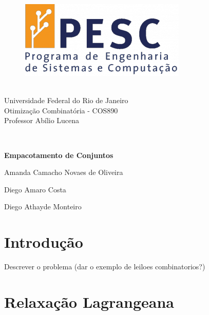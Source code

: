 \documentclass{article}
\begin{document}
	\begin{figure}
		\begin{flushleft}	
			\includegraphics[height=.065\textheight]{PESC.png}
		\end{flushleft}
	\end{figure}
	
	\quad\\
	{Universidade Federal do Rio de Janeiro} \\
	{Otimização Combinatória - COS890} \\
	{Professor Abílio Lucena}
	
	\quad\\
	\vspace*{2cm}
	
	\begin{center}
		\huge\bfseries
		Empacotamento de Conjuntos
	\end{center}
	\vspace*{3mm}
	
	\begin{center}
		\large
		Amanda Camacho Novaes de Oliveira
		
		Diego Amaro Costa	
		
		Diego Athayde Monteiro 
	\end{center}

	\vspace{1cm}
	
	\section{Introdução}
	Descrever o problema (dar o exemplo de leiloes combinatorios?)
	
	
	
	\section{Relaxação Lagrangeana}
	
\end{document}
